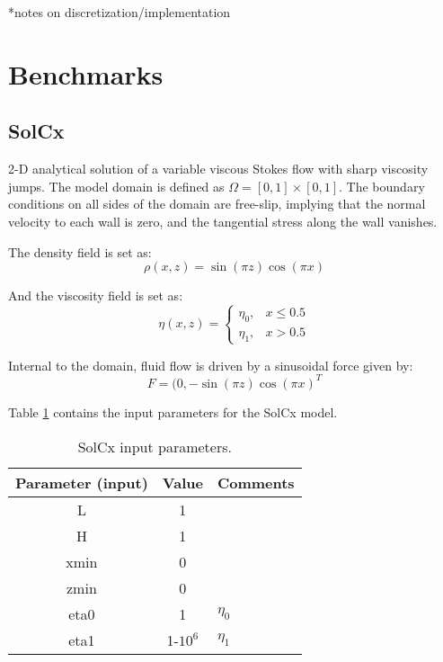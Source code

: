\documentclass[a4paper,11pt]{article}
\begin{document}
*notes on discretization/implementation

\section{Benchmarks}
\subsection{SolCx \citep{Zhong1996, Moresi1996, Duretz2011}}
2-D analytical solution of a variable viscous Stokes flow with sharp viscosity jumps. The model domain is defined as $\Omega = [0, 1] \times [0, 1]$. The boundary conditions on all sides of the domain are free-slip, implying that the normal velocity to each wall is zero, and the tangential stress along the wall vanishes. 

The density field is set as:
\begin{equation}
\rho(x,z) = \sin(\pi z) \cos(\pi x)
\end{equation}

And the viscosity field is set as:
\begin{equation}
\eta(x,z) = \left\{\begin{array}{lr}
    \eta_0, &  x \le 0.5\\
    \eta_1, & x > 0.5
  \end{array}\right.
\end{equation}

Internal to the domain, fluid flow is driven by a sinusoidal force given by:
\begin{equation}
F = (0,-\sin(\pi z) \cos(\pi x)^T
\end{equation}

Table \ref{tab:solcx} contains the input parameters for the SolCx model.

\begin{table}[h]
\begin{center}
\footnotesize
\begin{tabular}{c c l}
\hline 
Parameter (input)&Value&Comments\\
\hline
L&1&\\
H&1&\\
xmin&0&\\
zmin&0&\\
eta0&1&$\eta_0$\\
eta1&1-$10^6$&$\eta_1$\\
\hline  
\end{tabular}
\caption{SolCx input parameters.}
\label{tab:solcx}
\end{center}
\end{table}
\end{document}
